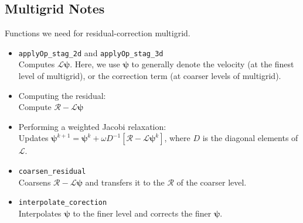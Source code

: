 \documentclass[final]{siamltex}
\def\bR {\bm{\mathcal{R}}}
\def\psib {\boldsymbol{\psi}}
\begin{document}
\subsection{Multigrid Notes}
Functions we need for residual-correction multigrid.
\begin{itemize}
\item {\tt applyOp\_stag\_2d} and {\tt applyOp\_stag\_3d}\\
Computes $\mathcal{L}\psib$.  Here, we use $\psib$ to generally denote the velocity (at the finest level of multigrid), or the correction term (at coarser levels of multigrid).
\item Computing the residual:\\
Compute $\bR - \mathcal{L}\psib$
\item Performing a weighted Jacobi relaxation:\\
Updates $\psib^{k+1} = \psib^k + \omega D^{-1}[\bR - \mathcal{L}\psib^k]$, where $D$ is the diagonal elements of $\mathcal{L}$.
\item {\tt coarsen\_residual}\\
Coarsens $\bR - \mathcal{L}\psib$ and transfers it to the $\bR$ of the coarser level.
\item {\tt interpolate\_corection}\\
Interpolates $\psib$ to the finer level and corrects the finer $\psib$.
\end{itemize}
\end{document}
